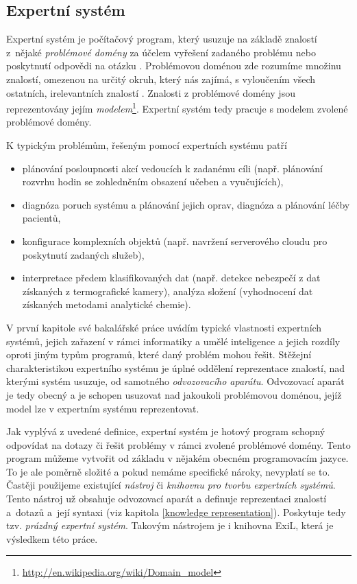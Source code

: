 \subsection{Expertní systém}

Expertní systém je počítačový program, který usuzuje na základě znalostí
z~nějaké \emph{problémové domény} za účelem vyřešení zadaného problému nebo
poskytnutí odpovědi na otázku \cite{introduction}. Problémovou doménou zde
rozumíme množinu znalostí, omezenou na určitý okruh, který nás zajímá, s
vyloučením všech ostatních, irelevantních znalostí \cite{problem-domain}.
Znalosti z problémové domény jsou reprezentovány jejím
\emph{modelem}\footnote{\url{http://en.wikipedia.org/wiki/Domain\_model}}.
Expertní systém tedy pracuje s modelem zvolené problémové domény.

K typickým problémům, řešeným pomocí expertních systému patří
\cite{introduction}
\begin{itemize}
  \item plánování posloupnosti akcí vedoucích k zadanému cíli (např.
    plánování rozvrhu hodin se zohledněním obsazení učeben a vyučujících),
  \item diagnóza poruch systému a plánování jejich oprav, diagnóza a plánování
    léčby pacientů,
  \item konfigurace komplexních objektů (např. navržení serverového cloudu pro
    poskytnutí zadaných služeb),
  \item interpretace předem klasifikovaných dat (např. detekce nebezpečí z dat
    získaných z termografické kamery), analýza složení (vyhodnocení dat
    získaných metodami analytické chemie).
\end{itemize}

V první kapitole své bakalářské práce \cite{bakalarka} uvádím typické vlastnosti
expertních systémů, jejich zařazení v rámci informatiky a umělé inteligence a
jejich rozdíly oproti jiným typům programů, které daný problém mohou řešit.
Stěžejní charakteristikou expertního systému je úplné oddělení reprezentace
znalostí, nad kterými systém usuzuje, od samotného \emph{odvozovacího aparátu}.
Odvozovací aparát je tedy obecný a je schopen usuzovat nad jakoukoli problémovou
doménou, jejíž model lze v expertním systému reprezentovat.

Jak vyplývá z uvedené definice, expertní systém je hotový program schopný
odpovídat na dotazy či řešit problémy v rámci zvolené problémové domény. Tento
program můžeme vytvořit od základu v nějakém obecném programovacím jazyce. To je
ale poměrně složité a pokud nemáme specifické nároky, nevyplatí se to. Častěji
použijeme existující \emph{nástroj} či \emph{knihovnu pro tvorbu expertních
systémů}. Tento nástroj už obsahuje odvozovací aparát a definuje reprezentaci
znalostí a~dotazů a~její syntaxi (viz kapitola \ref{knowledge representation}).
Poskytuje tedy tzv. \emph{prázdný expertní systém}. Takovým nástrojem je i
knihovna ExiL, která je výsledkem této práce.

